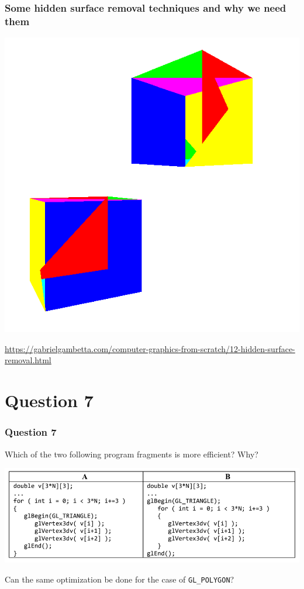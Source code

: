 \documentclass{beamer}
\begin{document}
\begin{frame}
    \frametitle{Some hidden surface removal techniques and why we need them}

    \begin{center}
        \includegraphics[scale=0.3]{hsr.png}
    \end{center}

    {\small
        \url{https://gabrielgambetta.com/computer-graphics-from-scratch/12-hidden-surface-removal.html}
    }

\end{frame}

\section{Question 7}

\begin{frame}
    \frametitle{Question 7}
    Which of the two following program fragments is more efficient? Why?

    \begin{center}
        \includegraphics[scale=0.6]{q7.png}
    \end{center}

    Can the same optimization be done for the case of \texttt{GL\_POLYGON}?
\end{frame}
\end{document}
